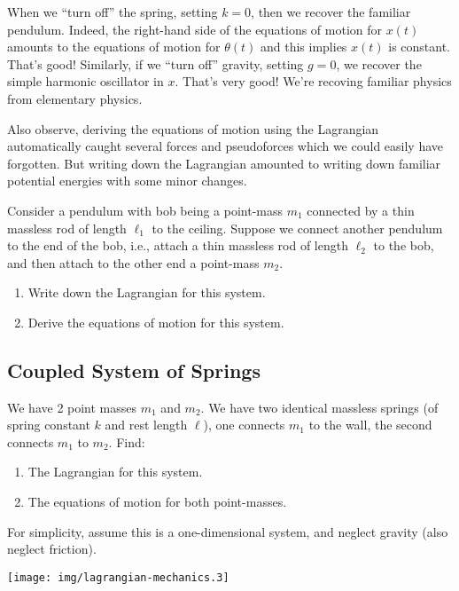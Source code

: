 When we ``turn off'' the spring, setting $k=0$, then we
recover the familiar pendulum. Indeed, the right-hand side of the
equations of motion for $x(t)$ amounts to the equations of motion for
$\theta(t)$ and this implies $x(t)$ is constant. That's good! Similarly, 
if we ``turn off'' gravity, setting $g=0$, we recover the simple
harmonic oscillator in $x$. That's very good! We're recoving familiar
physics from elementary physics.

Also observe, deriving the equations of motion using the Lagrangian
automatically caught several forces and pseudoforces which we could
easily have forgotten. But writing down the Lagrangian amounted to
writing down familiar potential energies with some minor changes.

\begin{exercise}
Consider a pendulum with bob being a point-mass $m_{1}$ connected by a
thin massless rod of length $\ell_{1}$ to the ceiling. Suppose we
connect another pendulum to the end of the bob, i.e., attach a thin
massless rod of length $\ell_{2}$ to the bob, and then attach to the
other end a point-mass $m_{2}$.
\begin{enumerate}
\item Write down the Lagrangian for this system.
\item Derive the equations of motion for this system.
\end{enumerate}
\end{exercise}

\subsection{Coupled System of Springs}

We have 2 point masses $m_{1}$ and $m_{2}$. We have two identical
massless springs (of spring constant $k$ and rest length $\ell$), one
connects $m_{1}$ to the wall, the second connects $m_{1}$ to $m_{2}$. Find:
\begin{enumerate}
\item The Lagrangian for this system.
\item The equations of motion for both point-masses.
\end{enumerate}
For simplicity, assume this is a one-dimensional system, and neglect
gravity (also neglect friction).

\begin{center}
\texttt{[image: img/lagrangian-mechanics.3]}
\end{center}

